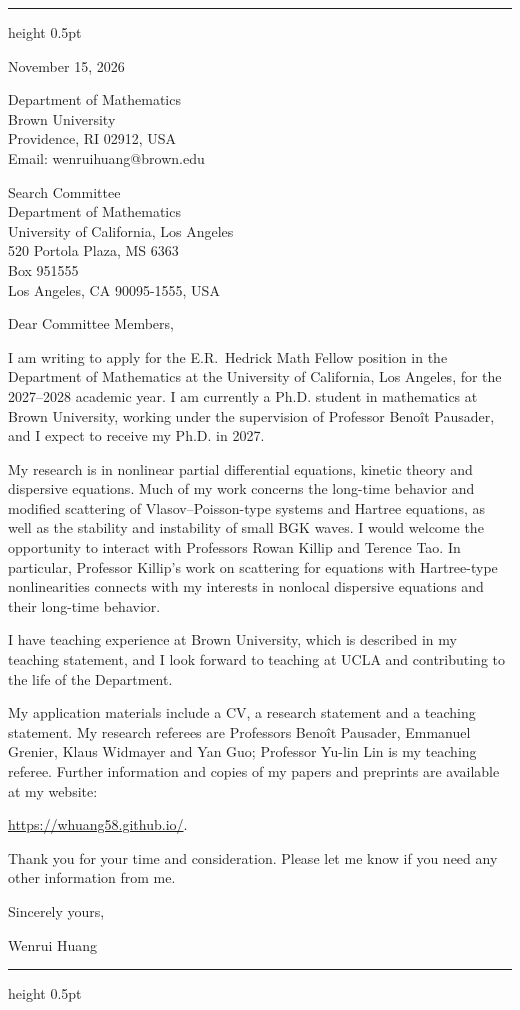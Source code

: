\documentclass[10pt]{article}
\begin{document}
\vspace{0.08in}
\hrule height 0.5pt

\vspace{0.47in}
\hfill
\begin{minipage}{2.27in}
November 15, 2026

\vspace{0.16in}
Department of Mathematics\\
Brown University\\
Providence, RI 02912, USA\\
Email: wenrui\textunderscore huang@brown.edu
\end{minipage}

\vspace{0.30in}
Search Committee\\
Department of Mathematics\\
University of California, Los Angeles\\
520 Portola Plaza, MS 6363\\
Box 951555\\
Los Angeles, CA 90095-1555, USA

\vspace{0.16in}
Dear Committee Members,

I am writing to apply for the E.R.\ Hedrick Math Fellow position in the Department of Mathematics at the University of California, Los Angeles, for the 2027--2028 academic year. I am currently a Ph.D. student in mathematics at Brown University, working under the supervision of Professor Beno\^{i}t Pausader, and I expect to receive my Ph.D. in 2027.

My research is in nonlinear partial differential equations, kinetic theory and dispersive equations. Much of my work concerns the long-time behavior and modified scattering of Vlasov--Poisson-type systems and Hartree equations, as well as the stability and instability of small BGK waves. I would welcome the opportunity to interact with Professors Rowan Killip and Terence Tao. In particular, Professor Killip's work on scattering for equations with Hartree-type nonlinearities connects with my interests in nonlocal dispersive equations and their long-time behavior.

I have teaching experience at Brown University, which is described in my teaching statement, and I look forward to teaching at UCLA and contributing to the life of the Department.

My application materials include a CV, a research statement and a teaching statement. My research referees are Professors Beno\^{i}t Pausader, Emmanuel Grenier, Klaus Widmayer and Yan Guo; Professor Yu-lin Lin is my teaching referee. Further information and copies of my papers and preprints are available at my website:

\url{https://whuang58.github.io/}.

\medskip
Thank you for your time and consideration. Please let me know if you need any other information from me.

\vspace{0.12in}
Sincerely yours,

\vspace{0.12in}
Wenrui Huang

\vfill
\hrule height 0.5pt
\end{document}

